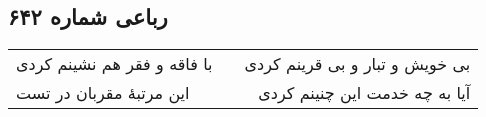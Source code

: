 \begin{center}
\section*{رباعی شماره ۶۴۲}
\label{sec:sh642}
\begin{longtable}{l p{0.5cm} r}
با فاقه و فقر هم نشینم کردی
&&
بی خویش و تبار و بی قرینم کردی
\\
این مرتبهٔ مقربان در تست
&&
آیا به چه خدمت این چنینم کردی
\\
\end{longtable}
\end{center}
